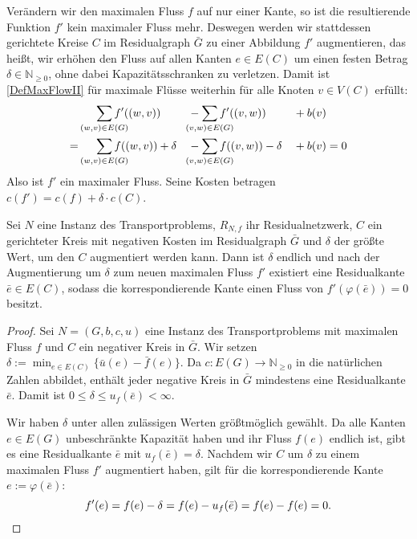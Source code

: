 Verändern wir den maximalen Fluss $f$ auf nur einer Kante, so ist die resultierende Funktion $f'$ kein maximaler Fluss mehr. Deswegen werden wir stattdessen gerichtete Kreise $C$ im Residualgraph $\bar{G}$ zu einer Abbildung $f'$ augmentieren, das heißt, wir erhöhen den Fluss auf allen Kanten $e\in E(C)$ um einen festen Betrag $\delta\in\mathbb{N}_{\geq0}$, ohne dabei Kapazitätsschranken zu verletzen. Damit ist \cref{DefMaxFlowII} für maximale Flüsse weiterhin für alle Knoten $v\in V(C)$ erfüllt:
\begin{alignat*}{3}
&\smashoperator[r]{\sum_{(w,v)\in E(G)}} f'((w,v)) &&-\sum_{\mathclap{(v,w)\in E(G)}} f'((v,w)) &&+ b(v)\\
=&\smashoperator[r]{\sum_{(w,v)\in E(G)}} f((w,v)) + \delta &&-\sum_{\mathclap{(v,w)\in E(G)}} f((v,w)) - \delta &&+ b(v) = 0\end{alignat*}
Also ist $f'$ ein maximaler Fluss. Seine Kosten betragen $c(f')=c(f) + \delta\cdot c(C)$.

\begin{lem}\label{negKreis}Sei $N$ eine Instanz des Transportproblems, $R_{N,f}$ ihr Residualnetzwerk, $C$ ein gerichteter Kreis mit negativen Kosten im Residualgraph $\bar{G}$ und $\delta$ der größte Wert, um den $C$ augmentiert werden kann. Dann ist $\delta$ endlich und nach der Augmentierung um $\delta$ zum neuen maximalen Fluss $f'$ existiert eine Residualkante $\bar{e}\in E(C)$, sodass die korrespondierende Kante einen Fluss von $f'(\varphi(\bar{e}))=0$ besitzt. 
\end{lem}
\begin{proof}Sei $N=(G,b,c,u)$ eine Instanz des Transportproblems mit maximalen Fluss $f$ und $C$ ein negativer Kreis in $\bar{G}$. Wir setzen $\delta:=\min_{e\in E(C)}\{\bar{u}(e)-\bar{f}(e)\}$. Da $c\colon E(G)\rightarrow\mathbb{N}_{\geq0}$ in die natürlichen Zahlen abbildet, enthält jeder negative Kreis in $\bar{G}$ mindestens eine Residualkante $\bar{e}$. Damit ist $0\leq\delta\leq u_f(\bar{e})<\infty$.

Wir haben $\delta$ unter allen zulässigen Werten größtmöglich gewählt. Da alle Kanten $e\in E(G)$ unbeschränkte Kapazität haben und ihr Fluss $f(e)$ endlich ist, gibt es eine Residualkante $\bar{e}$ mit $u_f(\bar{e})=\delta$. Nachdem wir $C$ um $\delta$ zu einem maximalen Fluss $f'$ augmentiert haben, gilt für die korrespondierende Kante $e:=\varphi(\bar{e})$:
\begin{equation*}
f'(e)=f(e)-\delta=f(e)-u_f(\bar{e})=f(e)-f(e)=0.\qedhere
\end{equation*}\end{proof}

